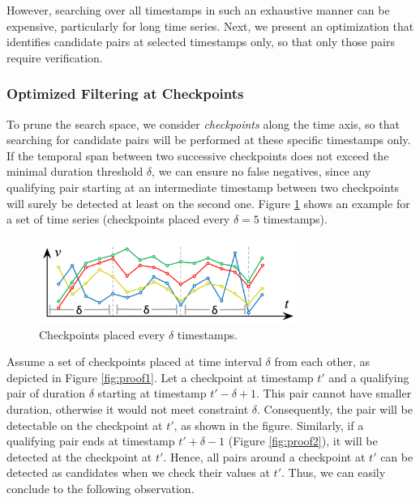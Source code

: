 However, searching over all timestamps in such an exhaustive manner can be expensive, particularly for long time series. Next, we present an optimization that identifies candidate pairs at selected timestamps only, so that only those pairs require verification.

\subsubsection{Optimized Filtering at Checkpoints}
\label{sec:checkpoint_join}

To prune the search space, we consider \textit{checkpoints} along the time axis, so that searching for candidate pairs will be performed at these specific timestamps only. If the temporal span between two successive checkpoints does not exceed the minimal duration threshold $\delta$, we can ensure no false negatives, since any qualifying pair starting at an intermediate timestamp between two checkpoints will surely be detected at least on the second one. Figure \ref{fig:checkpoints} shows an example for a set of time series (checkpoints placed every $\delta=5$ timestamps).

\begin{figure}[!tb]
    \centering
    \includegraphics[width=0.75\textwidth]{figures/checkpoints.png}
    \caption{Checkpoints placed every $\delta$ timestamps.}
    \label{fig:checkpoints}
\end{figure}

Assume a set of checkpoints placed at time interval $\delta$ from each other, as depicted in Figure \ref{fig:proof1}. Let a checkpoint at timestamp $t'$ and a qualifying pair of duration $\delta$ starting at timestamp $t'-\delta+1$. This pair cannot have smaller duration, otherwise it would not meet constraint $\delta$. Consequently, the pair will be detectable on the checkpoint at $t'$, as shown in the figure. Similarly, if a qualifying pair ends at timestamp $t'+\delta-1$ (Figure \ref{fig:proof2}), it will be detected at the checkpoint at $t'$. Hence, all pairs around a checkpoint at $t'$ can be detected as candidates when we check their values at $t'$. Thus, we can easily conclude to the following observation.

